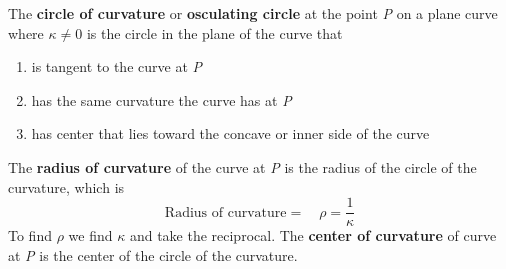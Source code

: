 \documentclass[12pt,a4paper]{article}
\begin{document}
The \textbf{circle of curvature} or \textbf{osculating circle} at the point \textit{P} on a plane curve where \(\kappa \neq 0\) is the circle in the plane of the curve that

\begin{enumerate}
  \item is tangent to the curve at \textit{P}
  \item has the same curvature the curve has at \textit{P}
  \item has center that lies toward the concave or inner side of the curve
\end{enumerate}

The \textbf{radius of curvature} of the curve at \textit{P} is the radius of the circle of the curvature, which is 
\[\text{Radius of curvature}= \quad \rho = \frac{1}{\kappa}\]
To find \(\rho\) we find \(\kappa\) and take the reciprocal. The \textbf{center of curvature} of curve at \textit{P} is the center of the circle of the curvature.
 \newpage
\end{document}
